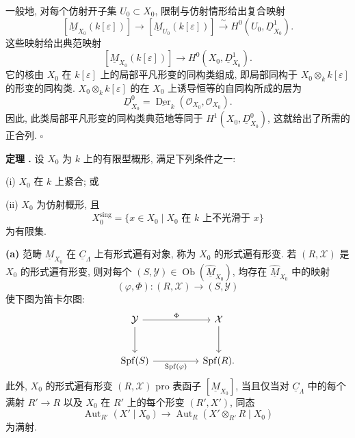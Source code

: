 
一般地, 对每个仿射开子集 $U_0\subset X_0$, 限制与仿射情形给出复合映射
\[
[\underline M_{X_0}(k[\varepsilon])]
\longrightarrow[\underline M_{U_0}(k[\varepsilon])]
\xrightarrow{\ \sim\ }H^0(U_0,\underline D^1_{X_0}).
\]
这些映射给出典范映射
\[
[\underline M_{X_0}(k[\varepsilon])]
\longrightarrow H^0(X_0,\underline D^1_{X_0}).
\]
它的核由 $X_0$ 在 $k[\varepsilon]$ 上的局部平凡形变的同构类组成, 即局部同构于 $X_0\otimes_k k[\varepsilon]$ 的形变的同构类. $X_0\otimes_k k[\varepsilon]$ 的在 $X_0$ 上诱导恒等的自同构所成的层为
\[
\underline D^0_{X_0}
=\underline{\operatorname{Der}}_k
  (\mathcal O_{X_0},\mathcal O_{X_0}).
\]
因此, 此类局部平凡形变的同构类典范地等同于 $H^1(X_0,\underline D^0_{X_0})$, 这就给出了所需的正合列. \hfill$\square$



\medskip
\noindent\textbf{定理 .}
设 $X_0$ 为 $k$ 上的有限型概形, 满足下列条件之一:

\smallskip
\noindent(i) $X_0$ 在 $k$ 上紧合; 或

\noindent(ii) $X_0$ 为仿射概形, 且
\[
X_0^{\mathrm{sing}}
=\{x\in X_0\mid X_0\text{ 在 }k\text{ 上不光滑于 }x\}
\]
为有限集.

\smallskip
\noindent\textbf{(a)}
范畴 $\underline M_{X_0}$ 在 $\underline C_\Lambda$ 上有形式遍有对象, 称为 $X_0$ 的形式遍有形变. 若 $(R,\mathcal X)$ 是 $X_0$ 的形式遍有形变, 则对每个 $(S,\mathcal Y)\in\operatorname{Ob}(\widehat{\underline M}_{X_0})$, 均存在 $\widehat{\underline M}_{X_0}$ 中的映射
\[
(\varphi,\Phi):(R,\mathcal X)\longrightarrow(S,\mathcal Y)
\]
使下图为笛卡尔图:
\[
\begin{tikzcd}[column sep=huge,row sep=large]
\mathcal Y \arrow[r,"\Phi"] \arrow[d]
& \mathcal X \arrow[d] \\
\operatorname{Spf}(S)
 \arrow[r,"\operatorname{Spf}(\varphi)"']
& \operatorname{Spf}(R).
\end{tikzcd}
\]
此外, $X_0$ 的形式遍有形变 $(R,\mathcal X)$ pro 表函子 $[\underline M_{X_0}]$, 当且仅当对 $\underline C_\Lambda$ 中的每个满射 $R'\longrightarrow R$ 以及 $X_0$ 在 $R'$ 上的每个形变 $(R',X')$, 同态
\[
\operatorname{Aut}_{R'}(X'\mid X_0)
\longrightarrow
\operatorname{Aut}_R(X'\otimes_{R'}R\mid X_0)
\]
为满射.

